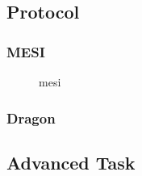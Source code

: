 \subsection{Protocol}

\subsubsection{MESI}

\begin{figure}[ht]
    \centering
    \caption{mesi}
    \label{fig:mesi}
\end{figure}

\subsubsection{Dragon}

\subsection{Advanced Task}
